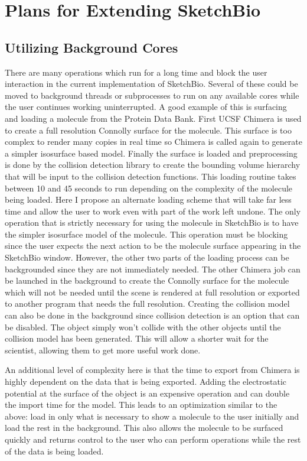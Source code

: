 \documentclass{article} %
\begin{document}
\section{Plans for Extending SketchBio}
\subsection{Utilizing Background Cores}
There are many operations which run for a long time and block the user interaction in the current implementation of SketchBio.  Several of these could be moved to background threads or subprocesses to run on any available cores while the user continues working uninterrupted.  A good example of this is surfacing and loading a molecule from the Protein Data Bank.  First UCSF Chimera is used to create a full resolution Connolly surface for the molecule.  This surface is too complex to render many copies in real time so Chimera is called again to generate a simpler isosurface based model.  Finally the surface is loaded and preprocessing is done by the collision detection library to create the bounding volume hierarchy that will be input to the collision detection functions.  This loading routine takes between 10 and 45 seconds to run depending on the complexity of the molecule being loaded.  Here I propose an alternate loading scheme that will take far less time and allow the user to work even with part of the work left undone.  The only operation that is strictly necessary for using the molecule in SketchBio is to have the simpler isosurface model of the molecule.  This operation must be blocking since the user expects the next action to be the molecule surface appearing in the SketchBio window.  However, the other two parts of the loading process can be backgrounded since they are not immediately needed.  The other Chimera job can be launched in the background to create the Connolly surface for the molecule which will not be needed until the scene is rendered at full resolution or exported to another program that needs the full resolution.  Creating the collision model can also be done in the background since collision detection is an option that can be disabled.  The object simply won't collide with the other objects until the collision model has been generated.  This will allow a shorter wait for the scientist, allowing them to get more useful work done.

An additional level of complexity here is that the time to export from Chimera is highly dependent on the data that is being exported.  Adding the electrostatic potential at the surface of the object is an expensive operation and can double the import time for the model.  This leads to an optimization similar to the above: load in only what is necessary to show a molecule to the user initially and load the rest in the background.  This also allows the molecule to be surfaced quickly and returns control to the user who can perform operations while the rest of the data is being loaded.
\end{document}
